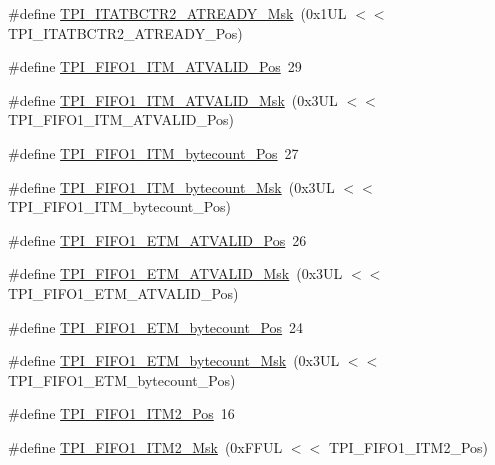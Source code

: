 \begin{DoxyCompactItemize}
\#define \hyperlink{group___c_m_s_i_s___t_p_i_ga1859502749709a2e5ead9a2599d998db}{T\+P\+I\+\_\+\+I\+T\+A\+T\+B\+C\+T\+R2\+\_\+\+A\+T\+R\+E\+A\+D\+Y\+\_\+\+Msk}~(0x1\+U\+L $<$$<$ T\+P\+I\+\_\+\+I\+T\+A\+T\+B\+C\+T\+R2\+\_\+\+A\+T\+R\+E\+A\+D\+Y\+\_\+\+Pos)
\item 
\#define \hyperlink{group___c_m_s_i_s___t_p_i_ga08edfc862b2c8c415854cc4ae2067dfb}{T\+P\+I\+\_\+\+F\+I\+F\+O1\+\_\+\+I\+T\+M\+\_\+\+A\+T\+V\+A\+L\+I\+D\+\_\+\+Pos}~29
\item 
\#define \hyperlink{group___c_m_s_i_s___t_p_i_gabc1f6a3b6cac0099d7c01ca949b4dd08}{T\+P\+I\+\_\+\+F\+I\+F\+O1\+\_\+\+I\+T\+M\+\_\+\+A\+T\+V\+A\+L\+I\+D\+\_\+\+Msk}~(0x3\+U\+L $<$$<$ T\+P\+I\+\_\+\+F\+I\+F\+O1\+\_\+\+I\+T\+M\+\_\+\+A\+T\+V\+A\+L\+I\+D\+\_\+\+Pos)
\item 
\#define \hyperlink{group___c_m_s_i_s___t_p_i_gaa22ebf7c86e4f4b2c98cfd0b5981375a}{T\+P\+I\+\_\+\+F\+I\+F\+O1\+\_\+\+I\+T\+M\+\_\+bytecount\+\_\+\+Pos}~27
\item 
\#define \hyperlink{group___c_m_s_i_s___t_p_i_gacba2edfc0499828019550141356b0dcb}{T\+P\+I\+\_\+\+F\+I\+F\+O1\+\_\+\+I\+T\+M\+\_\+bytecount\+\_\+\+Msk}~(0x3\+U\+L $<$$<$ T\+P\+I\+\_\+\+F\+I\+F\+O1\+\_\+\+I\+T\+M\+\_\+bytecount\+\_\+\+Pos)
\item 
\#define \hyperlink{group___c_m_s_i_s___t_p_i_ga3177b8d815cf4a707a2d3d3d5499315d}{T\+P\+I\+\_\+\+F\+I\+F\+O1\+\_\+\+E\+T\+M\+\_\+\+A\+T\+V\+A\+L\+I\+D\+\_\+\+Pos}~26
\item 
\#define \hyperlink{group___c_m_s_i_s___t_p_i_ga0e8f29a1e9378d1ceb0708035edbb86d}{T\+P\+I\+\_\+\+F\+I\+F\+O1\+\_\+\+E\+T\+M\+\_\+\+A\+T\+V\+A\+L\+I\+D\+\_\+\+Msk}~(0x3\+U\+L $<$$<$ T\+P\+I\+\_\+\+F\+I\+F\+O1\+\_\+\+E\+T\+M\+\_\+\+A\+T\+V\+A\+L\+I\+D\+\_\+\+Pos)
\item 
\#define \hyperlink{group___c_m_s_i_s___t_p_i_gaab31238152b5691af633a7475eaf1f06}{T\+P\+I\+\_\+\+F\+I\+F\+O1\+\_\+\+E\+T\+M\+\_\+bytecount\+\_\+\+Pos}~24
\item 
\#define \hyperlink{group___c_m_s_i_s___t_p_i_gab554305459953b80554fdb1908b73291}{T\+P\+I\+\_\+\+F\+I\+F\+O1\+\_\+\+E\+T\+M\+\_\+bytecount\+\_\+\+Msk}~(0x3\+U\+L $<$$<$ T\+P\+I\+\_\+\+F\+I\+F\+O1\+\_\+\+E\+T\+M\+\_\+bytecount\+\_\+\+Pos)
\item 
\#define \hyperlink{group___c_m_s_i_s___t_p_i_ga1828c228f3940005f48fb8dd88ada35b}{T\+P\+I\+\_\+\+F\+I\+F\+O1\+\_\+\+I\+T\+M2\+\_\+\+Pos}~16
\item 
\#define \hyperlink{group___c_m_s_i_s___t_p_i_gae54512f926ebc00f2e056232aa21d335}{T\+P\+I\+\_\+\+F\+I\+F\+O1\+\_\+\+I\+T\+M2\+\_\+\+Msk}~(0x\+F\+F\+U\+L $<$$<$ T\+P\+I\+\_\+\+F\+I\+F\+O1\+\_\+\+I\+T\+M2\+\_\+\+Pos)

\end{DoxyCompactItemize}
